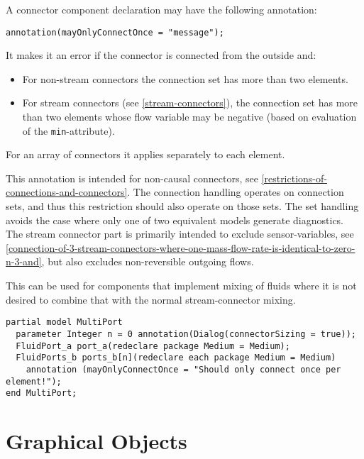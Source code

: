 A connector component declaration may have the following annotation:
\begin{lstlisting}[language=modelica]
annotation(mayOnlyConnectOnce = "message");
\end{lstlisting}%

It makes it an error if the connector is connected from the outside and:
\begin{itemize}
\item For non-stream connectors the connection set has more than two elements.
\item For stream connectors (see \cref{stream-connectors}), the connection set has more than two elements whose flow variable may be negative (based on evaluation of the \lstinline!min!-attribute).
\end{itemize}
For an array of connectors it applies separately to each element.

\begin{nonnormative}
This annotation is intended for non-causal connectors, see \cref{restrictions-of-connections-and-connectors}.
The connection handling operates on connection sets, and thus this restriction should also operate on those sets.
The set handling avoids the case where only one of two equivalent models generate diagnostics.
The stream connector part is primarily intended to exclude sensor-variables, see \cref{connection-of-3-stream-connectors-where-one-mass-flow-rate-is-identical-to-zero-n-3-and}, but also excludes non-reversible outgoing flows.
\end{nonnormative}

\begin{example}
This can be used for components that implement mixing of fluids where it is not desired to combine that with the normal stream-connector mixing.
\begin{lstlisting}[language=modelica]
partial model MultiPort
  parameter Integer n = 0 annotation(Dialog(connectorSizing = true));
  FluidPort_a port_a(redeclare package Medium = Medium);
  FluidPorts_b ports_b[n](redeclare each package Medium = Medium)
    annotation (mayOnlyConnectOnce = "Should only connect once per element!");
end MultiPort;
\end{lstlisting}
\end{example}

\section{Graphical Objects}\label{annotations-for-graphical-objects}\label{graphical-objects}

